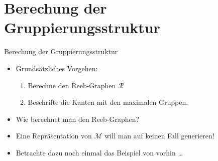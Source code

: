 \documentclass[
wide,
10pt,
xcolor={x11names,svgnames},
hyperref={pdfauthor={Jannes Bantje},colorlinks,urlcolor=maincolor,hidelinks=false,linkcolor=maincolor},
pantone312, 	%
euler-digits,
]{beamer}
\theoremstyle{definition}
\begin{document}
\section{Berechung der Gruppierungsstruktur}
\label{sec:Berechung der Gruppierungsstruktur}

\begin{frame}{Berechung der Gruppierungsstruktur}
    \begin{itemize}[<+->]
        \item Grundsätzliches Vorgehen:
        \begin{enumerate}
            \item Berechne den Reeb-Graphen $\mathcal{R}$
            \item Beschrifte die Kanten mit den maximalen Gruppen.
        \end{enumerate}
        \item Wie berechnet man den Reeb-Graphen?
        \item Eine Repräsentation von $\mathcal{M}$ will man auf keinen Fall generieren!
        \item Betrachte dazu noch einmal das Beispiel von vorhin \ldots
    \end{itemize}
\end{frame}
\end{document}
